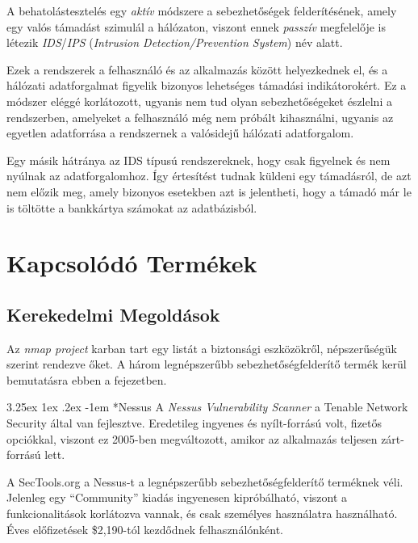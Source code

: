 \documentclass[a4paper,12pt]{article}
\makeatletter
\renewcommand\paragraph{\@startsection{paragraph}{6}{\parindent}%
  {3.25ex \@plus1ex \@minus .2ex}%
  {-1em}%
  {\normalfont\normalsize\bfseries}}
\makeatother
\begin{document}
	A behatolástesztelés egy \textit{aktív} módszere a sebezhetőségek felderítésének, amely egy valós támadást szimulál a hálózaton, viszont ennek \textit{passzív} megfelelője is létezik \textit{IDS}/\textit{IPS} (\textit{Intrusion Detection/Prevention System}) név alatt.
	
	Ezek a rendszerek a felhasználó és az alkalmazás között helyezkednek el, és a hálózati adatforgalmat figyelik bizonyos lehetséges támadási indikátorokért. Ez a módszer eléggé korlátozott, ugyanis nem tud olyan sebezhetőségeket észlelni a rendszerben, amelyeket a felhasználó még nem próbált kihasználni, ugyanis az egyetlen adatforrása a rendszernek a valósidejű hálózati adatforgalom.
	
	Egy másik hátránya az IDS típusú rendszereknek, hogy csak figyelnek és nem nyúlnak az adatforgalomhoz. Így értesítést tudnak küldeni egy támadásról, de azt nem előzik meg, amely bizonyos esetekben azt is jelentheti, hogy a támadó már le is töltötte a bankkártya számokat az adatbázisból.

\section{Kapcsolódó Termékek} \label{relwork}
	
\subsection{Kerekedelmi Megoldások} \label{ssec:comtools}
	
	Az \textit{nmap project} karban tart egy listát a biztonsági eszközökről, népszerűségük szerint rendezve őket\cite{sectools}. A három legnépszerűbb sebezhetőségfelderítő termék kerül bemutatásra ebben a fejezetben.
	
	\paragraph*{Nessus} A \textit{Nessus Vulnerability Scanner}\cite{nessus} a Tenable Network Security által van fejlesztve. Eredetileg ingyenes és nyílt-forrású volt, fizetős opciókkal, viszont ez 2005-ben megváltozott, amikor az alkalmazás teljesen zárt-forrású lett.
	
	A SecTools.org a Nessus-t a legnépszerűbb sebezhetőségfelderítő terméknek véli. Jelenleg egy ``Community'' kiadás ingyenesen kipróbálható, viszont a funkcionalitások korlátozva vannak, és csak személyes használatra használható. Éves előfizetések \$2,190-tól kezdődnek felhasználónként.
	
\end{document}
